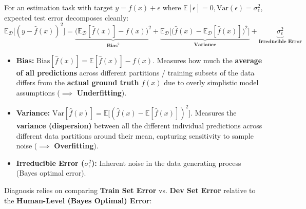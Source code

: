 \documentclass[10pt,a4paper]{article}
\begin{document}
\begin{tcolorbox}[
    colframe=themeblue, colback=lightbg, coltitle=white,
    fonttitle=\bfseries\sffamily\small,
    title={Mathematical Definition: Bias-Variance Decomposition},
    arc=1.3mm, boxrule=0.5pt, left=5pt, right=5pt, top=2pt, bottom=2pt
]
\footnotesize
For an estimation task with target $y = f(x) + \epsilon$ where $\mathbb{E}[\epsilon] = 0, \text{Var}(\epsilon) = \sigma_\epsilon^2$, expected test error decomposes cleanly:
\[
\mathbb{E}_{\mathcal{D}}\big[(y - \hat{f}(x))^2\big] = \underbrace{\Big(\mathbb{E}_{\mathcal{D}}[\hat{f}(x)] - f(x)\Big)^2}_{\textbf{Bias}^2} + \underbrace{\mathbb{E}_{\mathcal{D}}\Big[\big(\hat{f}(x) - \mathbb{E}_{\mathcal{D}}[\hat{f}(x)]\big)^2\Big]}_{\textbf{Variance}} + \underbrace{\sigma_\epsilon^2}_{\textbf{Irreducible Error}}
\]
\begin{itemize}[leftmargin=8pt, itemsep=0.5pt, topsep=0pt]
    \item \textbf{Bias:} $\text{Bias}[\hat{f}(x)] = \mathbb{E}[\hat{f}(x)] - f(x)$. Measures how much the \textbf{average of all predictions} across different partitions / training subsets of the data differs from the \textbf{actual ground truth} $f(x)$ due to overly simplistic model assumptions ($\implies$ \textbf{Underfitting}).
    \item \textbf{Variance:} $\text{Var}[\hat{f}(x)] = \mathbb{E}\big[(\hat{f}(x) - \mathbb{E}[\hat{f}(x)])^2\big]$. Measures the \textbf{variance (dispersion)} between all the different individual predictions across different data partitions around their mean, capturing sensitivity to sample noise ($\implies$ \textbf{Overfitting}).
    \item \textbf{Irreducible Error ($\sigma_\epsilon^2$):} Inherent noise in the data generating process (Bayes optimal error).
\end{itemize}
\end{tcolorbox}

\vspace{-3pt}

\par
Diagnosis relies on comparing \textbf{Train Set Error} vs. \textbf{Dev Set Error} relative to the \textbf{Human-Level (Bayes Optimal) Error}:
\end{document}
